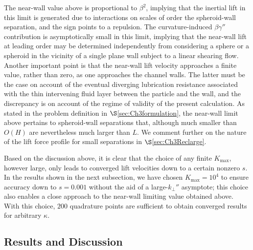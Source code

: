 \documentclass{jfm}
\begin{document}
 The near-wall value above is proportional to $\beta^2$, implying that the inertial lift in this limit is generated due to interactions on scales of order the spheroid-wall separation, and the sign points to a repulsion. The curvature-induced $\beta\gamma''$ contribution is asymptotically small in this limit, implying that the near-wall lift at leading order may be determined independently from considering a sphere or a spheroid in the vicinity of a single plane wall subject to a linear shearing flow. Another important point is that the near-wall lift velocity approaches a finite value, rather than zero, as one approaches the channel walls. The latter must be the case on account of the eventual diverging lubrication resistance associated with the thin intervening fluid layer between the particle and the wall, and the discrepancy is on account of the regime of validity of the present calculation. As stated in the problem definition in  $\S$\ref{sec:Ch3formulation}, the near-wall limit above pertains to spheroid-wall separations that, although much smaller than $O(H)$ are nevertheless much larger than $L$. We comment further on the nature of the lift force profile for small separations in $\S$\ref{sec:Ch3Reclarge}.

Based on the discussion above, it is clear that the choice of any finite $K_\text{max}$, however large, only leads to converged lift velocities down to a certain nonzero $s$. In the results shown in the next subsection, we have chosen $K_\text{max}=10^4$ to ensure accuracy down to $s=0.001$ without the aid of a large-$k_\perp''$ asymptote; this choice also enables a close approach to the near-wall limiting value obtained above. With this choice, $200$ quadrature points are sufficient to obtain converged results for arbitrary $\kappa$.


\subsection{Results and Discussion} \label{sec:smallRecresults}
\end{document}
